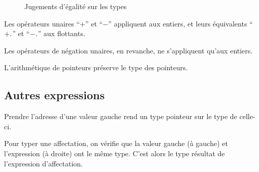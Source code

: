 \begin{mathpar}
\end{mathpar}

\begin{figure}[h]


  \begin{mathpar}



  \end{mathpar}

\caption{Jugements d'égalité sur les types}
\label{fig:jugement-eq}
\end{figure}

Les opérateurs unaires \enquote{$+$} et \enquote{$-$} appliquent aux entiers, et
leurs équivalents \enquote{$\floatop{+}$} et \enquote{$\floatop{-}$} aux
flottants.


Les opérateurs de négation unaires, en revanche, ne s'appliquent qu'aux
entiers.

\begin{mathpar}
\end{mathpar}

L'arithmétique de pointeurs préserve le type des pointeurs.

\begin{mathpar}
\end{mathpar}

\subsection*{Autres expressions}

Prendre l'adresse d'une valeur gauche rend un type pointeur sur le type de
celle-ci.

\begin{mathpar}
\end{mathpar}

Pour typer une affectation, on vérifie que la valeur gauche (à gauche) et
l'expression (à droite) ont le même type. C'est alors le type résultat de
l'expression d'affectation.

